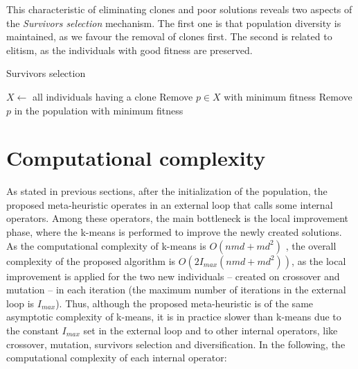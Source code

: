 This characteristic of eliminating clones and poor solutions reveals two aspects of the \textit{Survivors selection} mechanism. The first one is that population diversity is maintained, as we favour the removal of clones first. The second is related to elitism, as the individuals with good fitness are preserved. %

\begin{algorithm}[H]
\caption{Survivors selection}
\label{survivors}
\begin{algorithmic}[1]
\STATE $X \leftarrow $ all individuals having a clone
\STATE Remove $p \in X$ with minimum fitness
\ELSE
\STATE Remove $p$ in the population with minimum fitness
\ENDIF
\ENDFOR
\end{algorithmic}
\end{algorithm}


\section{Computational complexity}
\label{sec:complexity-algo}
As stated in previous sections, after the initialization of the population, the proposed meta-heuristic operates in an external loop that calls some internal operators. Among these operators, the main bottleneck is the local improvement phase, where the k-means is performed to improve the newly created solutions. As the computational complexity of k-means is $O(nmd + md^2)$ \cite{Hamerly2010}, the overall complexity of the proposed algorithm is $O(2 I_{max} (nmd + md^2))$, as the local improvement is applied for the two new individuals -- created on crossover and mutation -- in each iteration (the maximum number of iterations in the external loop is $I_{max}$). Thus, although the proposed meta-heuristic is of the same asymptotic complexity of k-means, it is in practice slower than k-means due to the constant $I_{max}$ set in the external loop and to other internal operators, like crossover, mutation, survivors selection and diversification. In the following, the computational complexity of each internal operator:

